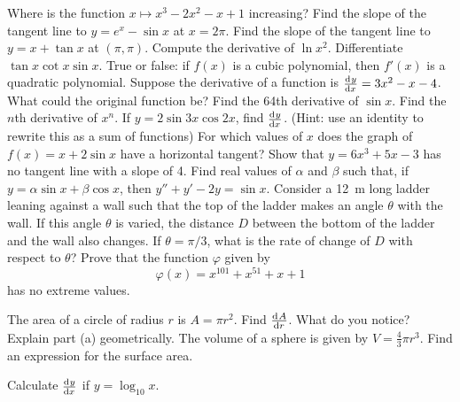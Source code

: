 \begin{questions}
  \questioA Where is the function $ x \mapsto x^3 - 2x^2 - x + 1 $ increasing?
  \questioA Find the slope of the tangent line to $ y = e^x - \sin x $ at $ x = 2\pi $.
  \questioA Find the slope of the tangent line to $ y = x + \tan x $ at $ (\pi, \pi) $.
  \questioA Compute the derivative of $ \ln x^2 $.
  \questioA Differentiate $ \tan x \cot x \sin x $.
  \questioA True or false: if $ f(x) $ is a cubic polynomial, then $ f'(x) $ is a quadratic polynomial.
  \questioA Suppose the derivative of a function is $ \od{y}{x} = 3x^2 - x - 4 $. What could the original function be?
  \questioM Find the 64th derivative of $ \sin x $.
  \questioM Find the $ n$th derivative of $ x^n $.
  \questioM If $ y = 2\sin 3x \cos 2x $, find $ \od{y}{x} $. (Hint: use an identity to rewrite this as a sum of functions)
  \questioM For which values of $ x $ does the graph of $ f(x) = x + 2\sin x $ have a horizontal tangent?
  \questioE Show that $ y = 6x^3 + 5x - 3 $ has no tangent line with a slope of 4.
  \questioE Find real values of $ \alpha $ and $ \beta $ such that, if $ y = \alpha \sin x + \beta \cos x $,
            then $ y'' + y' -2y = \sin x $.
  \questioE Consider a \SI{12}{\metre} long ladder leaning against a wall such that the top of the ladder makes an
            angle $ \theta $ with the wall. If this angle $ \theta $ is varied, the distance $ D $ between the bottom
            of the ladder and the wall also changes. If $ \theta = \pi/3 $, what is the rate of change of $ D $ with
            respect to $ \theta $?
  \questioE Prove that the function $ \varphi $ given by
            \begin{displaymath}
              \varphi(x) = x^{101} + x^{51} + x + 1
            \end{displaymath}
            has no extreme values.
  \question
    \begin{parts}
      \parA The area of a circle of radius $ r $ is $ A = \pi r^2 $. Find $ \od{A}{r} $. What do you notice?
      \parM Explain part (a) geometrically.
      \parE The volume of a sphere is given by $ V = \frac{4}{3} \pi r^3 $. Find an expression for the surface area.
    \end{parts}
  \questioE Calculate $ \od{y}{x} $ if $ y = \log_{10} x $.
\end{questions}


